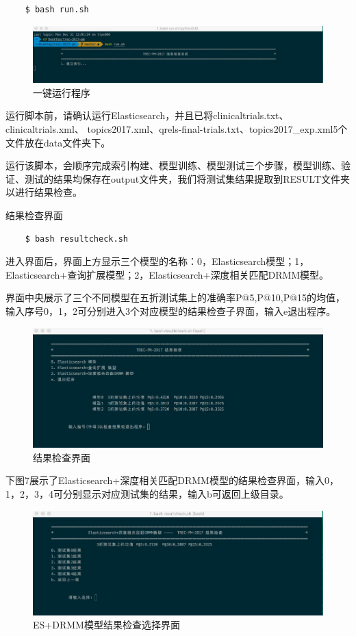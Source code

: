 \documentclass[a4paper]{article}
\begin{document}
\begin{verbatim}
    $ bash run.sh
\end{verbatim}
\par
\begin{figure}[H]
	\centering
	\includegraphics[width=0.7\linewidth]{4}
	\caption{一键运行程序}
	\label{fig:4}
\end{figure}
运行脚本前，请确认运行Elasticsearch，并且已将clinicaltrials.txt、clinicaltrials.xml、
topics2017.xml、qrels-final-trials.txt、topics2017\_exp.xml5个文件放在data文件夹下。
\par
运行该脚本，会顺序完成索引构建、模型训练、模型测试三个步骤，模型训练、验证、测试的结果均保存在output文件夹，我们将测试集结果提取到RESULT文件夹以进行结果检查。
\par
结果检查界面
\begin{verbatim}
    $ bash resultcheck.sh
\end{verbatim}
\par
进入界面后，界面上方显示三个模型的名称：0，Elasticsearch模型；1，Elasticsearch+查询扩展模型；2，Elasticsearch+深度相关匹配DRMM模型。
\par
界面中央展示了三个不同模型在五折测试集上的准确率P@5,P@10,P@15的均值，输入序号0，1，2可分别进入3个对应模型的结果检查子界面，输入e退出程序。
\begin{figure}[H]
	\centering
	\includegraphics[width=0.7\linewidth]{1}
	\caption{结果检查界面}
	\label{fig:1}
\end{figure}
\par
下图7展示了Elasticsearch+深度相关匹配DRMM模型的结果检查界面，输入0，1，2，3，4可分别显示对应测试集的结果，输入b可返回上级目录。
\begin{figure}[H]
	\centering
	\includegraphics[width=0.7\linewidth]{2}
	\caption{ES+DRMM模型结果检查选择界面}
	\label{fig:2}
\end{figure}
\end{document}
